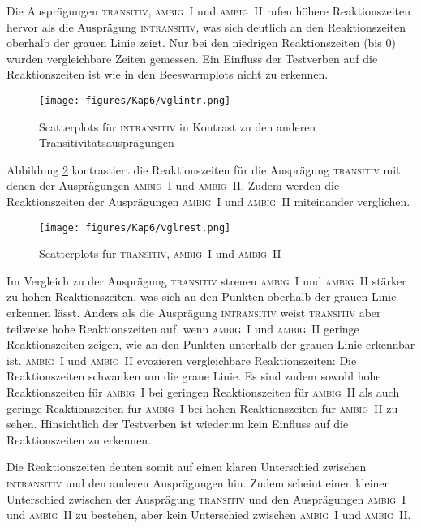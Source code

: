 Die Ausprägungen \textsc{transitiv}, \textsc{ambig~I} und \textsc{ambig~II} rufen höhere Reaktionszeiten hervor als die Ausprägung \textsc{intransitiv}, was sich deutlich an den Reaktionszeiten oberhalb der grauen Linie zeigt. Nur bei den niedrigen Reaktionszeiten (bis 0) wurden vergleichbare Zeiten gemessen. Ein Einfluss der Testverben auf die Reaktionszeiten ist wie in den Beeswarmplots nicht zu erkennen.

\begin{figure}[h]
\texttt{[image: figures/Kap6/vglintr.png]} 
\caption{Scatterplots für \textsc{intransitiv} in Kontrast zu den anderen Transitivitätsausprägungen}
\label{scatterintr}
\end{figure}

Abbildung \ref{scatterrest} kontrastiert die Reaktionszeiten für die Ausprägung \textsc{transitiv} mit denen der Ausprägungen \textsc{ambig~I} und \textsc{ambig~II}. Zudem werden die Reaktionszeiten der Ausprägungen \textsc{ambig~I} und \textsc{ambig~II} miteinander verglichen. 

\begin{figure}
\texttt{[image: figures/Kap6/vglrest.png]} 
\caption{Scatterplots für \textsc{transitiv}, \textsc{ambig~I} und \textsc{ambig~II}}
\label{scatterrest}
\end{figure}

Im Vergleich zu der Ausprägung \textsc{transitiv} streuen \textsc{ambig~I} und \textsc{ambig~II} stärker zu hohen Reaktionszeiten, was sich an den Punkten oberhalb der grauen Linie erkennen lässt. Anders als die Ausprägung \textsc{intransitiv} weist \textsc{transitiv} aber teilweise hohe Reaktionszeiten auf, wenn \textsc{ambig~I} und \textsc{ambig~II} geringe Reaktionszeiten zeigen, wie an den Punkten unterhalb der grauen Linie erkennbar ist. \textsc{ambig~I} und \textsc{ambig~II} evozieren vergleichbare Re\-ak\-tions\-zei\-ten: Die Reaktionszeiten schwanken um die graue Linie. Es sind zudem sowohl hohe Reaktionszeiten für \textsc{ambig~I} bei geringen Reaktionszeiten für \textsc{ambig~II} als auch geringe Reaktionszeiten für \textsc{ambig~I} bei hohen Reaktionszeiten für \textsc{ambig~II} zu sehen. Hinsichtlich der Testverben ist wiederum kein Einfluss auf die Reaktionszeiten zu erkennen. 


Die Reaktionszeiten deuten somit auf einen klaren Unterschied zwischen \textsc{intransitiv} und den anderen Ausprägungen hin. Zudem scheint einen kleiner Unterschied zwischen der Ausprägung \textsc{transitiv} und den Ausprägungen \textsc{ambig~I} und \textsc{ambig~II} zu bestehen, aber kein Unterschied zwischen \textsc{ambig~I} und \textsc{ambig~II}. 

